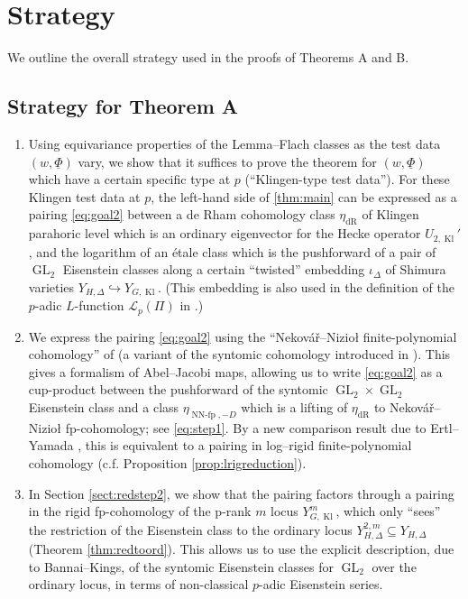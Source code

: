 \documentclass[cjm]{ipart}
\theoremstyle{plain}
\theoremstyle{remark}
\DeclareMathOperator{\GL}{GL}
\DeclareMathOperator{\Kl}{Kl}
\DeclareMathOperator{\NNfp}{NN-fp}
\newcommand{\Nek}{Nekov\'a\v{r}\xspace}
\newcommand{\Niz}{Nizio\l\xspace}
\newcommand{\cL}{\mathcal{L}}
\newcommand{\dR}{\mathrm{dR}}
\newcommand{\uPhi}{\underline{\Phi}}
\numberwithin{equation}{subsection}
\begin{document}
\section{Strategy}

 We outline the overall strategy used in the proofs of Theorems A and B.

 \subsection{Strategy for Theorem A}

  \begin{enumerate}
   \item Using equivariance properties of the Lemma--Flach classes as the test data $(w, \uPhi)$ vary, we show that it suffices to prove the theorem for $(w, \uPhi)$ which have a certain specific type at $p$ (``Klingen-type test data''). For these Klingen test data at $p$, the left-hand side of \cref{thm:main} can be expressed as a pairing \eqref{eq:goal2} between a de Rham cohomology class $\eta_{\dR}$ of Klingen parahoric level which is an ordinary eigenvector for the Hecke operator $U_{2, \Kl}'$, and the logarithm of an \'etale class which is the pushforward of a pair of $\GL_2$ Eisenstein classes along a certain ``twisted'' embedding $\iota_\Delta$ of Shimura varieties $Y_{H,\Delta}\hookrightarrow Y_{G,\Kl}$. (This embedding is also used in the definition of the $p$-adic $L$-function $\cL_p(\Pi)$ in \cite{LPSZ1}.)

   \item We express the pairing \eqref{eq:goal2} using the ``\Nek--\Niz finite-polynomial cohomology'' of \cite{besserloefflerzerbes16} (a variant of the syntomic cohomology introduced in \cite{nekovarniziol16}). This gives a formalism of Abel--Jacobi maps, allowing us to write \eqref{eq:goal2} as a cup-product between the pushforward of the syntomic $\GL_2 \times \GL_2$ Eisenstein class and a class $\eta_{\NNfp,-D}$ which is a lifting of $\eta_{\dR}$ to \Nek--\Niz fp-cohomology; see \eqref{eq:step1}. By a new comparison result due to Ertl--Yamada \cite{ertlyamada19}, this is equivalent to a pairing in log--rigid finite-polynomial cohomology (c.f. Proposition \ref{prop:lrigreduction}). %

   \item In Section \ref{sect:redstep2}, we show that the pairing factors through a pairing in the rigid fp-cohomology of the p-rank $m$ locus $Y_{G, \Kl}^m$, which only ``sees'' the restriction of the Eisenstein class to the ordinary locus $Y_{H,\Delta}^{2,m} \subseteq Y_{H, \Delta}$ (Theorem \ref{thm:redtoord}). This allows us to use the explicit description, due to Bannai--Kings, of the syntomic Eisenstein classes for $\GL_2$ over the ordinary locus, in terms of non-classical $p$-adic Eisenstein series.


\end{enumerate}
\end{document}
